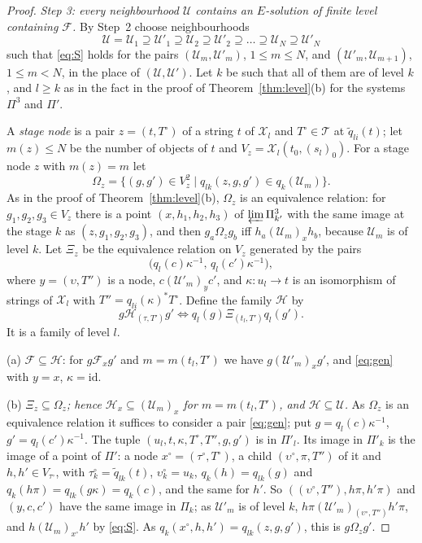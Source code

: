 \documentclass[11pt]{amsart}
\theoremstyle{definition}
\newcommand{\cX}{\mathcal X}
\newcommand{\id}{\mathrm{id}}
\begin{document}
\begin{proof}
\emph{Step 3: every neighbourhood $\mathcal U$ contains an
$E$-solution of finite level containing $\mathcal F$.} By Step~2
choose neighbourhoods
\[
\mathcal U=\mathcal U_1\supseteq\mathcal U'_1\supseteq\mathcal U_2
\supseteq\mathcal U'_2\supseteq\dots\supseteq\mathcal U_N\supseteq
\mathcal U'_N
\]
such that \eqref{eq:S} holds for the pairs $(\mathcal U_m,\mathcal
U'_m)$, $1\le m\le N$, and $(\mathcal U'_m,\mathcal U_{m+1})$, $1\le
m<N$, in the place of $(\mathcal U,\mathcal U')$. Let $k$ be such
that all of them are of level $k$, and $l\ge k$ as in the fact in the
proof of Theorem~\ref{thm:level}(b) for the systems $\Pi^3$ and
$\Pi'$.

A \emph{stage node} is a pair $z=(t,T^\circ)$ of a string $t$ of
$\cX_l$ and $T^\circ\in\mathcal T$ at $\tilde q_{li}(t)$; let
$m(z)\le N$ be the number of objects of $t$ and $V_z=\cX_l(t_0,
(s_l)_0)$. For a stage node $z$ with $m(z)=m$ let
\[
\Omega_z=\{(g,g')\in V_z^2\mid q_{lk}(z,g,g')\in q_k(\mathcal U_m)\}.
\]
As in the proof of Theorem~\ref{thm:level}(b), $\Omega_z$ is an
equivalence relation: for $g_1,g_2,g_3\in V_z$ there is a point
$(x,h_1,h_2,h_3)$ of $\varprojlim\Pi^3_{k'}$ with the same image at
the stage $k$ as $(z,g_1,g_2,g_3)$, and then $g_a\mathrel{\Omega_z}
g_b$ iff $h_a\mathrel{(\mathcal U_m)_x}h_b$, because $\mathcal U_m$
is of level $k$. Let $\Xi_z$ be the equivalence relation on $V_z$
generated by the pairs
\begin{equation}\label{eq:gen}
\bigl(q_l(c)\kappa^{-1},\,q_l(c')\kappa^{-1}\bigr),
\end{equation}
where $y=(\upsilon,T'')$ is a node, $c\mathrel{(\mathcal U'_m)_y}c'$,
and $\kappa\colon u_l\to t$ is an isomorphism of strings of $\cX_l$
with $T''=q_{li}(\kappa)^*T^\circ$. Define the family $\mathcal H$ by
\[
g\mathrel{\mathcal H_{(\tau,T')}}g'\iff q_l(g)\mathrel{\Xi_{(t_l,T')}}
q_l(g').
\]
It is a family of level $l$.

(a) \emph{$\mathcal F\subseteq\mathcal H$}: for $g\mathrel{\mathcal
F_x}g'$ and $m=m(t_l,T')$ we have $g\mathrel{(\mathcal U'_m)_x}g'$,
and \eqref{eq:gen} with $y=x$, $\kappa=\id$.

(b) \emph{$\Xi_z\subseteq\Omega_z$; hence $\mathcal H_x\subseteq
(\mathcal U_m)_x$ for $m=m(t_l,T')$, and $\mathcal H\subseteq\mathcal
U$.} As $\Omega_z$ is an equivalence relation it suffices to consider
a pair \eqref{eq:gen}; put $g=q_l(c)\kappa^{-1}$, $g'=q_l(c')
\kappa^{-1}$. The tuple $(u_l,t,\kappa,T^\circ,T'',g,g')$ is in
$\Pi'_l$. Its image in $\Pi'_k$ is the image of a point of $\Pi'$: a
node $x^\circ=(\tau^\circ,T^\circ)$, a child $(\upsilon^\circ,\pi,
T'')$ of it and $h,h'\in V_{\tau^\circ}$, with $\tau^\circ_k=\tilde
q_{lk}(t)$, $\upsilon^\circ_k=u_k$, $q_k(h)=q_{lk}(g)$ and
$q_k(h\pi)=q_{lk}(g\kappa)=q_k(c)$, and the same for $h'$. So
$((\upsilon^\circ,T''),h\pi,h'\pi)$ and $(y,c,c')$ have the same
image in $\Pi_k$; as $\mathcal U'_m$ is of level $k$,
$h\pi\mathrel{(\mathcal U'_m)_{(\upsilon^\circ,T'')}}h'\pi$, and
$h\mathrel{(\mathcal U_m)_{x^\circ}}h'$ by \eqref{eq:S}. As
$q_k(x^\circ,h,h')=q_{lk}(z,g,g')$, this is $g\mathrel{\Omega_z}g'$.


\end{proof}
\end{document}
